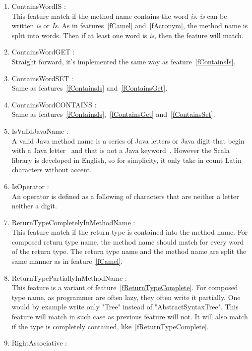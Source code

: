 \documentclass[12pt]{article}
\begin{document}
\begin{enumerate}
\item ContainsWordIS :\label{fContainsIs}\\
	This feature match if the method name contains the word \textit{is}. \textit{is} can be written \textit{is} or \textit{Is}. As in features~\ref{fCamel} and~\ref{fAcronym}, the method name is split into words. Then if at least one word is \textit{is}, then the feature will match. 
\item ContainsWordGET :\label{fContainsGet}\\
	Straight forward, it's implemented the same way as feature~\ref{fContainsIs}.
\item ContainsWordSET :\label{fContainsSet}\\
	Same as features~\ref{fContainsIs} and~\ref{fContainsGet}.
\item ContainsWordCONTAINS :\label{fContainsContains}\\
	Same as features~\ref{fContainsIs},~\ref{fContainsGet} and~\ref{fContainsSet}.
\item IsValidJavaName :\label{fValidJavaName}\\
	A valid Java method name is a series of Java letters or Java digit that begin with a Java letter~\cite{jls_ident} and that is not a Java keyword~\cite{jls_keyword}. However the Scala library is developed in English, so for simplicity, it only take in count Latin characters without accent.
\item IsOperator :\label{fOperator}\\
	An operator is defined as a following of characters that are neither a letter neither a digit.
\item ReturnTypeCompletelyInMethodName :\label{fReturnTypeComplete}\\
	This feature match if the return type is contained into the method name. For composed return type name, the method name should match for every word of the return type. The return type name and the method name are split the same manner as in feature~\ref{fCamel}. 
\item ReturnTypePartiallyInMethodName :\\
	This feature is a variant of feature~\ref{fReturnTypeComplete}. For composed type name, as programmer are often lazy, they often write it partially. One would by example write only "Tree" instead of "AbstractSyntaxTree". This feature will match in such case as previous feature will not. It will also match if the type is completely contained, like~\ref{fReturnTypeComplete}.
\item RightAssociative :\\

\end{enumerate}
\end{document}
